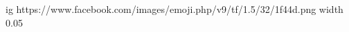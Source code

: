  
 
 
 
 
\ifcmt
  ig https://www.facebook.com/images/emoji.php/v9/tf/1.5/32/1f44d.png
  width 0.05
\fi
